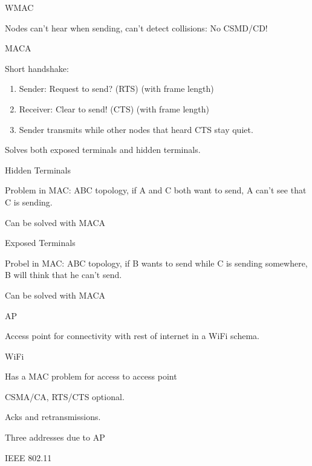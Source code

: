 \documentclass[main.tex]{subfiles}
\begin{document}
\begin{card}{WMAC}
\item Nodes can't hear when sending, can't detect collisions: No CSMD/CD!
\end{card}

\begin{card}{MACA}
\item Short handshake:
    \begin{enumerate}
        \item Sender: Request to send? (RTS) (with frame length)
        \item Receiver: Clear to send! (CTS) (with frame length)
        \item Sender transmits while other nodes that heard CTS stay quiet.
    \end{enumerate}
\item Solves both exposed terminals and hidden terminals.
\end{card}

\begin{card}{Hidden Terminals}
\item Problem in MAC: ABC topology, if A and C both want to send, A can't see that C is sending.
\item Can be solved with MACA
\end{card}

\begin{card}{Exposed Terminals}
\item Probel in MAC: ABC topology, if B wants to send while C is sending somewhere, B will think that he can't send.
\item Can be solved with MACA
\end{card}

\begin{card}{AP}
\item Access point for connectivity with rest of internet in a WiFi schema.
\end{card}

\begin{card}{WiFi}
\item Has a MAC problem for access to access point
\item CSMA/CA, RTS/CTS optional.
\item Acks and retransmissions.
\item Three addresses due to AP
\item IEEE 802.11
\end{card}
\end{document}
